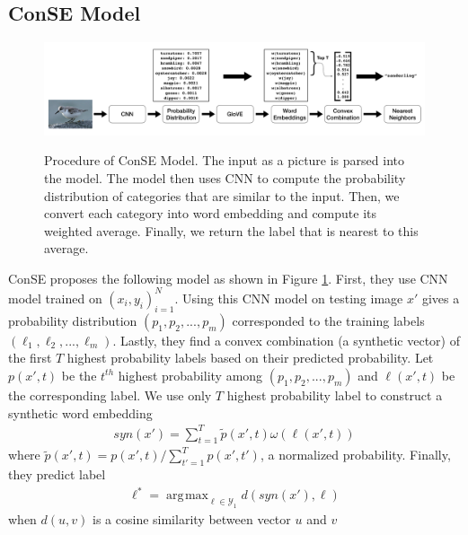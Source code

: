 \documentclass[11pt,letterpaper]{article}
\DeclareMathOperator*{\argmax}{\arg\!\max}
\begin{document}
\subsection{ConSE Model}
\begin{figure}[ht]\label{fig:pipeline}
\centering
{\includegraphics[width=1.8\columnwidth]{pipeline.png}}
\caption{
Procedure of ConSE Model. The input as a picture is parsed into the model. The model then uses CNN to compute the probability distribution of categories that are similar to the input. Then, we convert each category into word embedding and compute its weighted average. Finally, we return the label that is nearest to this average.
}
\end{figure}

ConSE proposes the following model as shown in Figure \ref{fig:pipeline}. First, they use CNN model trained on $(x_i,y_i)^{N}_{i=1}$. Using this CNN model on testing image $x'$ gives a probability distribution $(p_1,p_2,...,p_m)$ corresponded to the training labels $(\ell_1,\ell_2,...,\ell_m)$. Lastly, they find a convex combination (a synthetic vector) of the first $T$ highest probability labels based on their predicted probability. Let $p(x',t)$ be the $t^{th}$ highest probability among $(p_1,p_2,...,p_m)$ and $\ell(x',t)$ be the corresponding label. We use only $T$ highest probability label to construct a synthetic word embedding
\begin{align*}
syn(x') = \sum\limits_{t = 1}^T \tilde{p}(x',t) \omega(\ell(x',t))
\end{align*}
where  $\tilde{p}(x',t)  = p(x',t) / \sum\nolimits_{t'=1}^T p(x',t') $, a normalized probability. Finally, they predict label 
\begin{align*}
\ell^* = \argmax_{\ell \in \mathcal{Y}_1} d(syn(x'), \ell)
\end{align*}
when $d(u,v)$ is a cosine similarity between vector $u$ and $v$
\end{document}
